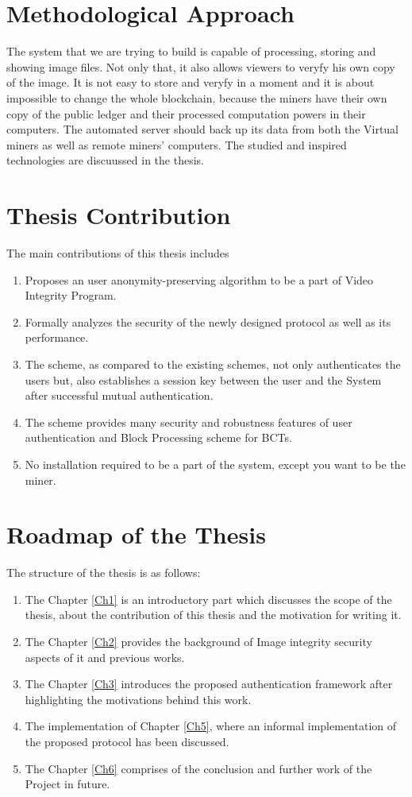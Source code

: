 \section{Methodological Approach}
The system that we are trying to build is capable of processing, storing and showing image files. Not only that, it also allows viewers to veryfy his own copy of the image. It is not easy to store and veryfy in a moment and it is about impossible to change the whole blockchain, because the miners have their own copy of the public ledger and their processed computation powers in their computers. The automated server should back up its data from both the Virtual miners as well as remote miners' computers. The studied and inspired technologies are discuussed in the thesis.

\section{Thesis Contribution}
The main contributions of this thesis includes
\begin{enumerate}
\item Proposes an user anonymity-preserving algorithm to be a part of Video Integrity Program.
\item Formally analyzes the security of the newly designed protocol as well as its performance.
\item The scheme, as compared to the existing schemes, not only authenticates the users but, also establishes a session key between the user and the System after successful mutual authentication.
\item The scheme provides many security and robustness features of user authentication and Block Processing scheme for BCTs.
\item No installation required to be a part of the system, except you want to be the miner.
\end{enumerate}

\section{Roadmap of the Thesis}
The structure of the thesis is as follows:
\begin{enumerate}
\item The Chapter \ref{Ch1} is an introductory part which discusses the scope of the thesis, about the contribution of this thesis and the motivation for writing it.
\item The Chapter \ref{Ch2} provides the background of Image integrity security aspects of it and previous works.
\item The Chapter \ref{Ch3} introduces the proposed authentication framework after highlighting the motivations behind this work.
\item The implementation of Chapter \ref{Ch5}, where an informal implementation of the proposed protocol has been discussed.
\item The Chapter \ref{Ch6} comprises of the conclusion and further work of the Project in future.
\end{enumerate}

